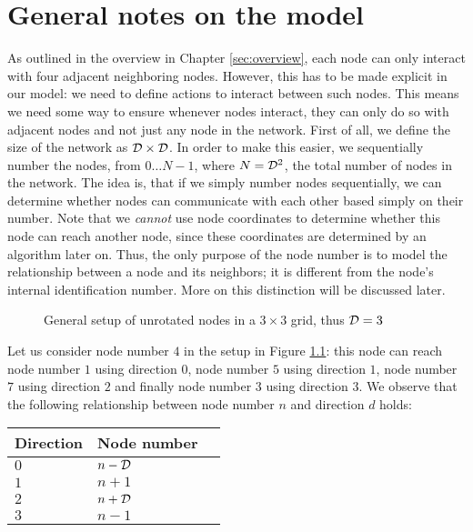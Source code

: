 \chapter{General notes on the model}
\label{sec:generalnotes}

As outlined in the overview in Chapter \ref{sec:overview}, each node can only interact with four adjacent neighboring nodes. However, this has to be made explicit in our model: we need to define actions to interact between such nodes. This means we need some way to ensure whenever nodes interact, they can only do so with adjacent nodes and not just any node in the network. First of all, we define the size of the network as $\mathcal{D} \times \mathcal{D}$. In order to make this easier, we sequentially number the nodes, from $0 \dots N - 1$, where $N = \mathcal{D}^2$, the total number of nodes in the network. The idea is, that if we simply number nodes sequentially, we can determine whether nodes can communicate with each other based simply on their number. Note that we \emph{cannot} use node coordinates to determine whether this node can reach another node, since these coordinates are determined by an algorithm later on. Thus, the only purpose of the node number is to model the relationship between a node and its neighbors; it is different from the node's internal identification number. More on this distinction will be discussed later.

\begin{figure}[ht]
 \centering
 \begin{nodefigure}
 \end{nodefigure}
 \caption{\label{fig:gensetup} General setup of unrotated nodes in a $3 \times 3$ grid, thus $\mathcal{D} = 3$}
\end{figure}

Let us consider node number $4$ in the setup in Figure \ref{fig:gensetup}: this node can reach node number $1$ using direction $0$, node number $5$ using direction $1$, node number $7$ using direction $2$ and finally node number $3$ using direction $3$. We observe that the following relationship between node number $n$ and direction $d$ holds:

\begin{center}
\begin{tabular}{|l|l|l|}
\hline
\textbf{Direction} & \textbf{Node number} \\
\hline
$0$ & $n - \mathcal{D}$ \\
\hline
$1$ & $n + 1$ \\
\hline
$2$ & $n + \mathcal{D}$ \\
\hline
$3$ & $n - 1$ \\
\hline
\end{tabular}
\end{center}

